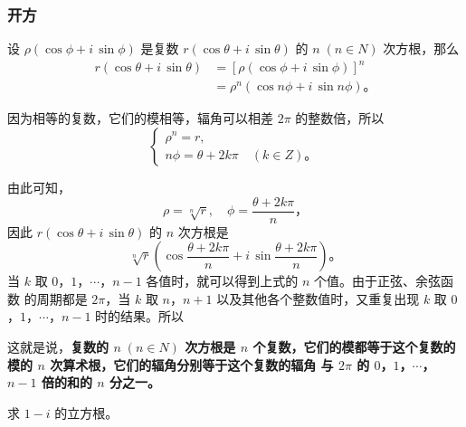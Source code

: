 \subsubsection{开方}\label{subsec:5-7-3}

设 $\rho (\cos\phi + i\,\sin\phi)$ 是复数 $r (\cos\theta + i\,\sin\theta)$ 的 $n \; (n \in N)$ 次方根，那么
\begin{align*}
    r (\cos\theta + i\,\sin\theta) &= [\rho (\cos\phi + i\,\sin\phi)]^n \\
        &= \rho^n (\cos n\phi + i\,\sin n\phi) \text{。}
\end{align*}

因为相等的复数，它们的模相等，辐角可以相差 $2\pi$ 的整数倍，所以
$$\begin{cases}
    \rho^n = r, \\
    n\phi = \theta + 2k\pi \quad (k \in Z) \text{。}
\end{cases}$$

由此可知，
$$ \rho = \sqrt[n]{r},\quad \phi = \dfrac{\theta + 2k\pi}{n} \text{，}$$
因此 $r (\cos\theta + i\,\sin\theta)$ 的 $n$ 次方根是
$$ \sqrt[n]{r} \left( \cos\dfrac{\theta + 2k\pi}{n} + i\,\sin\dfrac{\theta + 2k\pi}{n} \right) \text{。}$$
当 $k$ 取 $0$，$1$，$\cdots$，$n - 1$ 各值时，就可以得到上式的 $n$ 个值。由于正弦、余弦函数
的周期都是 $2\pi$，当 $k$ 取 $n$，$n + 1$ 以及其他各个整数值时，又重复出现
$k$ 取 $0$，$1$，$\cdots$，$n - 1$ 时的结果。所以
\begin{center}
\end{center}
这就是说，\textbf{复数的 $n \; (n \in N)$ 次方根是 $n$ 个复数，它们的模都等于这个复数的模的 $n$ 次算术根，它们的辐角分别等于这个复数的辐角
与 $2\pi$ 的 $0$，$1$，$\cdots$，$n - 1$ 倍的和的 $n$ 分之一。}



\setcounter{cntliti}{5}
\liti 求 $1 - i$ 的立方根。

